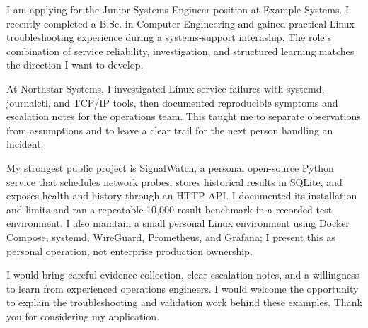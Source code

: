 \begin{cvletter}

I am applying for the Junior Systems Engineer position at Example Systems. I recently completed a B.Sc. in Computer Engineering and gained practical Linux troubleshooting experience during a systems-support internship. The role's combination of service reliability, investigation, and structured learning matches the direction I want to develop.

At Northstar Systems, I investigated Linux service failures with systemd, journalctl, and TCP/IP tools, then documented reproducible symptoms and escalation notes for the operations team. This taught me to separate observations from assumptions and to leave a clear trail for the next person handling an incident.

My strongest public project is SignalWatch, a personal open-source Python service that schedules network probes, stores historical results in SQLite, and exposes health and history through an HTTP API. I documented its installation and limits and ran a repeatable 10,000-result benchmark in a recorded test environment. I also maintain a small personal Linux environment using Docker Compose, systemd, WireGuard, Prometheus, and Grafana; I present this as personal operation, not enterprise production ownership.

I would bring careful evidence collection, clear escalation notes, and a willingness to learn from experienced operations engineers. I would welcome the opportunity to explain the troubleshooting and validation work behind these examples. Thank you for considering my application.

\end{cvletter}
